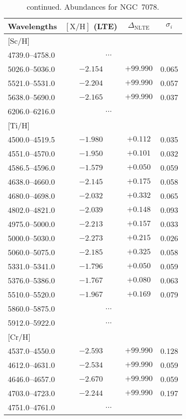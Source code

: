 \documentclass{aa}
\begin{document}
\begin{appendix}
\addtocounter{table}{-1}
\begin{table}
\caption{continued. Abundances for NGC~7078.}
{\tiny
\begin{tabular}{lccc} \\ \hline\hline
Wavelengths & $\mathrm{[X/H]}$ (LTE) & $\Delta_\mathrm{NLTE}$ & $\sigma_i$ \\ \hline
% 
\mbox{[Sc/H]} \\
4739.0--4758.0 & \multicolumn{2}{c}{$\ldots$} \\
5026.0--5036.0 & $-2.154$ & $+99.990$ & 0.065\\
5521.0--5531.0 & $-2.204$ & $+99.990$ & 0.057\\
5638.0--5690.0 & $-2.165$ & $+99.990$ & 0.037\\
6206.0--6216.0 & \multicolumn{2}{c}{$\ldots$} \\
\mbox{[Ti/H]} \\
4500.0--4519.5 & $-1.980$ & $+0.112$ & 0.035\\
4551.0--4570.0 & $-1.950$ & $+0.101$ & 0.032\\
4586.5--4596.0 & $-1.579$ & $+0.050$ & 0.059\\
4638.0--4660.0 & $-2.145$ & $+0.175$ & 0.058\\
4680.0--4698.0 & $-2.032$ & $+0.332$ & 0.065\\
4802.0--4821.0 & $-2.039$ & $+0.148$ & 0.093\\
4975.0--5000.0 & $-2.213$ & $+0.157$ & 0.033\\
5000.0--5030.0 & $-2.273$ & $+0.215$ & 0.026\\
5060.0--5075.0 & $-2.185$ & $+0.325$ & 0.058\\
5331.0--5341.0 & $-1.796$ & $+0.050$ & 0.059\\
5376.0--5386.0 & $-1.767$ & $+0.080$ & 0.063\\
5510.0--5520.0 & $-1.967$ & $+0.169$ & 0.079\\
5860.0--5875.0 & \multicolumn{2}{c}{$\ldots$} \\
5912.0--5922.0 & \multicolumn{2}{c}{$\ldots$} \\
\mbox{[Cr/H]} \\
4537.0--4550.0 & $-2.593$ & $+99.990$ & 0.128\\
4612.0--4631.0 & $-2.534$ & $+99.990$ & 0.059\\
4646.0--4657.0 & $-2.670$ & $+99.990$ & 0.059\\
4703.0--4723.0 & $-2.244$ & $+99.990$ & 0.197\\
4751.0--4761.0 & \multicolumn{2}{c}{$\ldots$} \\

\end{tabular}}
\end{table}
\end{appendix}
\end{document}
